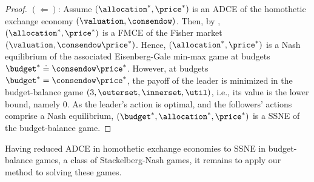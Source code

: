 \begin{proof}
    $(\Leftarrow)$: Assume $(\allocation^*, \price^*)$ is an ADCE of the homothetic exchange economy $(\valuation, \consendow)$. Then, by , $(\allocation^*, \price^*)$ is a FMCE of the Fisher market $(\valuation, \consendow \price^*)$. Hence, $(\allocation^*, \price^*)$ is a Nash equilibrium of the associated Eisenberg-Gale min-max game at budgets $\budget^* \doteq \consendow \price^*$. However, at budgets $\budget^* = \consendow \price^*$, the payoff of the leader is minimized in the budget-balance game $(3, \outerset, \innerset, \util)$, i.e., its value is the lower bound, namely 0. As the leader's action is optimal, and the followers' actions comprise a Nash equilibrium, $(\budget^*, \allocation^*, \price^*)$ is a SSNE of the budget-balance game.
\end{proof}
\fi


Having reduced ADCE in homothetic exchange economies to SSNE in budget-balance games, a class of Stackelberg-Nash games, it remains to apply our method 
to solving these games. 

